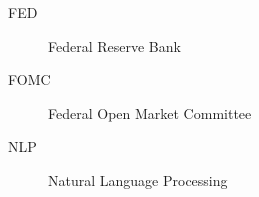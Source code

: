 %
\begin{description}
	\item[FED] Federal Reserve Bank
	\item[FOMC] Federal Open Market Committee
	\item[NLP] Natural Language Processing
\end{description}